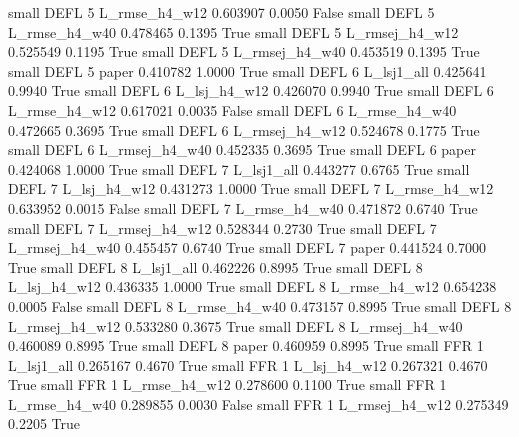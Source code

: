      small     DEFL                 5  L_rmse_h4_w12   0.603907      0.0050   False
     small     DEFL                 5  L_rmse_h4_w40   0.478465      0.1395    True
     small     DEFL                 5 L_rmsej_h4_w12   0.525549      0.1195    True
     small     DEFL                 5 L_rmsej_h4_w40   0.453519      0.1395    True
     small     DEFL                 5          paper   0.410782      1.0000    True
     small     DEFL                 6     L_lsj1_all   0.425641      0.9940    True
     small     DEFL                 6   L_lsj_h4_w12   0.426070      0.9940    True
     small     DEFL                 6  L_rmse_h4_w12   0.617021      0.0035   False
     small     DEFL                 6  L_rmse_h4_w40   0.472665      0.3695    True
     small     DEFL                 6 L_rmsej_h4_w12   0.524678      0.1775    True
     small     DEFL                 6 L_rmsej_h4_w40   0.452335      0.3695    True
     small     DEFL                 6          paper   0.424068      1.0000    True
     small     DEFL                 7     L_lsj1_all   0.443277      0.6765    True
     small     DEFL                 7   L_lsj_h4_w12   0.431273      1.0000    True
     small     DEFL                 7  L_rmse_h4_w12   0.633952      0.0015   False
     small     DEFL                 7  L_rmse_h4_w40   0.471872      0.6740    True
     small     DEFL                 7 L_rmsej_h4_w12   0.528344      0.2730    True
     small     DEFL                 7 L_rmsej_h4_w40   0.455457      0.6740    True
     small     DEFL                 7          paper   0.441524      0.7000    True
     small     DEFL                 8     L_lsj1_all   0.462226      0.8995    True
     small     DEFL                 8   L_lsj_h4_w12   0.436335      1.0000    True
     small     DEFL                 8  L_rmse_h4_w12   0.654238      0.0005   False
     small     DEFL                 8  L_rmse_h4_w40   0.473157      0.8995    True
     small     DEFL                 8 L_rmsej_h4_w12   0.533280      0.3675    True
     small     DEFL                 8 L_rmsej_h4_w40   0.460089      0.8995    True
     small     DEFL                 8          paper   0.460959      0.8995    True
     small      FFR                 1     L_lsj1_all   0.265167      0.4670    True
     small      FFR                 1   L_lsj_h4_w12   0.267321      0.4670    True
     small      FFR                 1  L_rmse_h4_w12   0.278600      0.1100    True
     small      FFR                 1  L_rmse_h4_w40   0.289855      0.0030   False
     small      FFR                 1 L_rmsej_h4_w12   0.275349      0.2205    True
